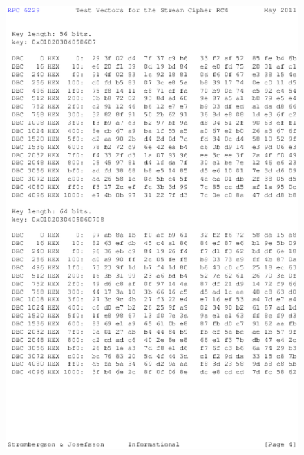 \begin{anexosenv}
\begin{figure}
\centering
\includegraphics{figuras/file-3}
\end{figure}


\end{anexosenv}
